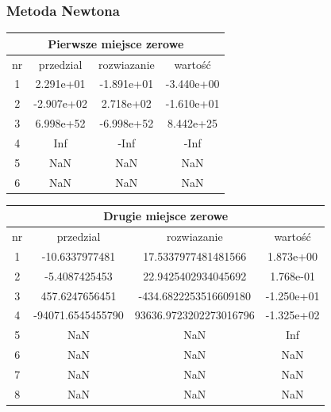 \documentclass[11pt, oneside]{article}   	%
\begin{document}
\subsubsection{Metoda Newtona}

\begin{center}
\begin{tabular}{ |c|c|c|c| } 
\hline
\multicolumn{4}{|c|}{Pierwsze miejsce zerowe} \\
 \hline
 nr & przedzial & rozwiazanie & wartość \\
 \hline
  1 &    2.291e+01 &   -1.891e+01 &   -3.440e+00 \\ 
  2 &   -2.907e+02 &    2.718e+02 &   -1.610e+01 \\ 
  3 &    6.998e+52 &   -6.998e+52 &    8.442e+25 \\ 
  4 &          Inf &         -Inf &         -Inf \\ 
  5 &          NaN &          NaN &          NaN \\ 
  6 &          NaN &          NaN &          NaN \\ 
 \hline
\end{tabular}
\end{center}

\begin{center}
\begin{tabular}{ |c|c|c|c| } 
\hline
\multicolumn{4}{|c|}{Drugie miejsce zerowe} \\
 \hline
 nr & przedzial & rozwiazanie & wartość \\
 \hline
1 & -10.6337977481 & 17.5337977481481566 &    1.873e+00 \\ 
  2 & -5.4087425453 & 22.9425402934045692 &    1.768e-01 \\ 
  3 & 457.6247656451 & -434.6822253516609180 &   -1.250e+01 \\ 
  4 & -94071.6545455790 & 93636.9723202273016796 &   -1.325e+02 \\ 
  5 &          NaN &          NaN &          Inf \\ 
  6 &          NaN &          NaN &          NaN \\ 
  7 &          NaN &          NaN &          NaN \\ 
  8 &          NaN &          NaN &          NaN \\ 
   \hline
\end{tabular}
\end{center}
\end{document}

